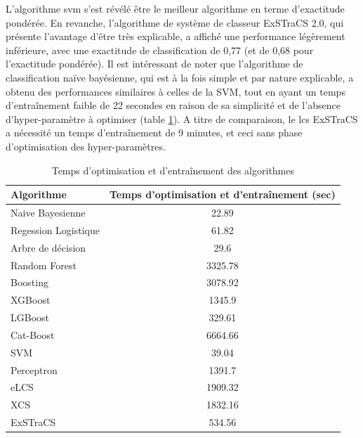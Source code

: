 L'algorithme \gls{svm} s'est révélé être le meilleur algorithme en terme d'exactitude pondérée. En revanche, l'algorithme de système de classeur ExSTraCS 2.0, qui présente l'avantage d'être très explicable, a affiché une performance légèrement inférieure, avec une exactitude de classification de 0,77 (et de 0,68 pour l'exactitude pondérée). Il est intéressant de noter que l'algorithme de classification naïve bayésienne, qui est à la fois simple et par nature explicable, a obtenu des performances similaires à celles de la SVM, tout en ayant un temps d'entraînement faible de 22 secondes en raison de sa simplicité et de l'absence d'hyper-paramètre à optimiser (table \ref{tab:pipeline_times}). A titre de comparaison, le \gls{lcs} ExSTraCS a nécessité un temps d'entraînement de 9 minutes, et ceci sans phase d'optimisation des hyper-paramètres.
\begin{table}[htbp]
    \centering
    \begin{tabular}{lc}
        \toprule
        Algorithme & Temps d'optimisation et d'entraînement (sec) \\
        \midrule
        Naive Bayesienne & 22.89 \\
        Regession Logistique & 61.82 \\
        Arbre de décision & 29.6 \\
        Random Forest & 3325.78 \\
        Boosting & 3078.92 \\
        XGBoost & 1345.9 \\
        LGBoost & 329.61 \\
        Cat-Boost & 6664.66 \\
        SVM & 39.04 \\
        Perceptron & 1391.7 \\
        eLCS & 1909.32 \\
        XCS & 1832.16 \\
        ExSTraCS & 534.56 \\
        \bottomrule
    \end{tabular}
    \caption{Temps d'optimisation et d'entraînement des algorithmes}
    \label{tab:pipeline_times}
\end{table}
